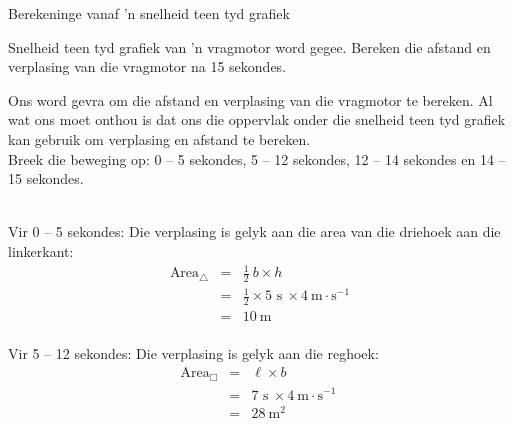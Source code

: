     \noindent 
\begin{wex}{Berekeninge vanaf 'n snelheid teen tyd grafiek}
{Snelheid teen tyd grafiek van 'n vragmotor word gegee. Bereken die afstand en verplasing van die vragmotor na 15 sekondes.
\begin{center}
\end{center}}
{
Ons word gevra om die afstand en verplasing van die vragmotor te bereken. Al wat ons moet onthou is dat ons die oppervlak onder die snelheid teen tyd grafiek kan gebruik om verplasing en afstand te bereken.\\

Breek die beweging op: 0 -- 5 sekondes, 5 -- 12 sekondes, 12 -- 14 sekondes en 14 -- 15 sekondes.\\
\\
\begin{minipage}{0.4\textwidth}
Vir 0 -- 5 sekondes: Die verplasing is gelyk aan die area van die driehoek aan die linkerkant:
\begin{eqnarray*}
\text{Area}_{\triangle} &=& \frac{1}{2}~b \times h\\
&=& \frac{1}{2} \times 5\text{~s}\ \times 4 ~\text{m}\cdot \text{s}^{-1}  \\
&=&10\ \text{m}\\
\end{eqnarray*}
\end{minipage}
\begin{minipage}{0.05\textwidth}
\begin{center}
\end{center}
\end{minipage}
\begin{minipage}{0.4\textwidth}
Vir 5 -- 12 sekondes: Die verplasing is gelyk aan die reghoek:\\
\begin{eqnarray*}
\text{Area}_{\Box} &=& \ell \times b\\
&=&7\text{~s}\ \times 4 ~\text{m}\cdot \text{s}^{-1}\ \\
&=&28\ \text{m}^2\\
\end{eqnarray*}
\end{minipage}

}
\end{wex}

